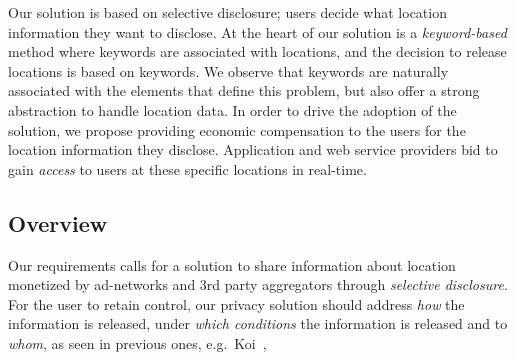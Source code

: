 Our solution is based on selective disclosure; users decide what location information they want to disclose.
At the heart of our solution is a \emph{keyword-based} method where keywords are associated with locations, and the decision to release locations is based on keywords. 
We observe that keywords are naturally associated with the elements that define this problem, but also offer a strong abstraction to handle location data.  
In order to drive the adoption of the solution, we propose providing economic compensation to the users for the location information they disclose. 
Application and web service providers bid to gain \emph{access} to users at these specific locations in real-time. 

\subsection{Overview}
Our requirements calls for a solution to share information about location monetized by ad-networks and 3rd party aggregators through \emph{selective disclosure}. For the user to retain control, our privacy solution should address \emph{how} the information is released, under \emph{which conditions} the information is released and to \emph{whom}, as seen in previous ones, e.g.~Koi~\cite{guha:koi}, 


